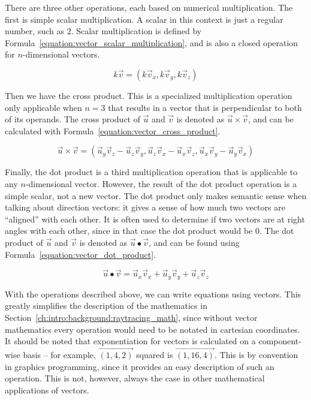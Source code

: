 There are three other operations, each based on numerical multiplication.
The first is simple scalar multiplication.
A scalar in this context is just a regular number, such as $2$.
Scalar multiplication is defined by Formula~\ref{equation:vector_scalar_multiplication}, and is also a closed operation for $n$-dimensional vectors.

\begin{equation}
  \label{equation:vector_scalar_multiplication}
  k\vec{v} = (k\vec{v}_x, k\vec{v}_y, k\vec{v}_z)
\end{equation}

Then we have the cross product.
This is a specialized multiplication operation only applicable when $n = 3$ that results in a vector that is perpendicular to both of its operands.
The cross product of $\vec{u}$ and $\vec{v}$ is denoted as $\vec{u} \times \vec{v}$, and can be calculated with Formula~\ref{equation:vector_cross_product}.

\begin{equation}
  \label{equation:vector_cross_product}
  \vec{u} \times \vec{v} = (\vec{u}_y\vec{v}_z - \vec{u}_z\vec{v}_y, \vec{u}_z\vec{v}_x - \vec{u}_x\vec{v}_z, \vec{u}_x\vec{v}_y - \vec{u}_y\vec{v}_x)
\end{equation}

Finally, the dot product is a third multiplication operation that is applicable to any $n$-dimensional vector.
However, the result of the dot product operation is a simple scalar, not a new vector.
The dot product only makes semantic sense when talking about direction vectors: it gives a sense of how much two vectors are ``aligned'' with each other.
It is often used to determine if two vectors are at right angles with each other, since in that case the dot product would be $0$.
The dot product of $\vec{u}$ and $\vec{v}$ is denoted as $\vec{u} \bullet \vec{v}$, and can be found using Formula~\ref{equation:vector_dot_product}.

\begin{equation}
  \label{equation:vector_dot_product}
  \vec{u} \bullet \vec{v} = \vec{u}_x\vec{v}_x + \vec{u}_y\vec{v}_y + \vec{u}_z\vec{v}_z
\end{equation}


With the operations described above, we can write equations using vectors.
This greatly simplifies the description of the mathematics in Section~\ref{ch:intro:background:raytracing_math}, since without vector mathematics every operation would need to be notated in cartesian coordinates.
It should be noted that exponentiation for vectors is calculated on a component-wise basis -- for example, $\vec{(1, 4, 2)}$ squared is $\vec{(1, 16, 4)}$.
This is by convention in graphics programming, since it provides an easy description of such an operation.
This is not, however, always the case in other mathematical applications of vectors.

